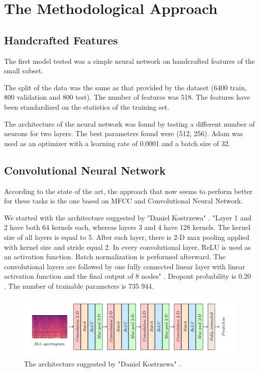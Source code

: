 \section{The Methodological Approach}


\subsection{Handcrafted Features}
The first model tested was a simple neural network on handcrafted features of the small subset.

The split of the data was the same as that provided by the dataset (6400 train, 800 validation and 800 test).
The number of features was 518. The features have been standardized on the statistics of the training set.

The architecture of the neural network was found by testing a different number of neurons for two layers. 
The best parameters found were (512, 256).
Adam was used as an optimizer with a learning rate of 0.0001 and a batch size of 32.

\subsection{Convolutional Neural Network}
According to the state of the art, the approach that now seems to perform better for these tasks is the one based on MFCC and Convolutional Neural Network. 

We started with the architecture suggested by "Daniel Kostrzewa" \cite{kostrzewa2021music}.
"Layer 1 and 2 have both 64 kernels each, whereas layers 3 and 4 have 128 kernels. The kernel size of all layers is equal to 5. After each layer, there is 2-D max pooling applied with kernel size and stride equal 2. In every convolutional layer, ReLU is used as an activation function. Batch normalization is performed afterward. The convolutional layers are followed by one fully connected linear layer with linear activation function and the final output of 8 nodes" \cite{kostrzewa2021music}. Dropout probability is 0.20 . The number of trainable parameters is 735 944.

\begin{figure}[ht]
\centering
\includegraphics[scale=0.6]{images/CNN-architecture.png}
\caption{The architecture suggested by "Daniel Kostrzewa" \cite{kostrzewa2021music}.}
\label{fig:CNN-architecture}
\end{figure}

